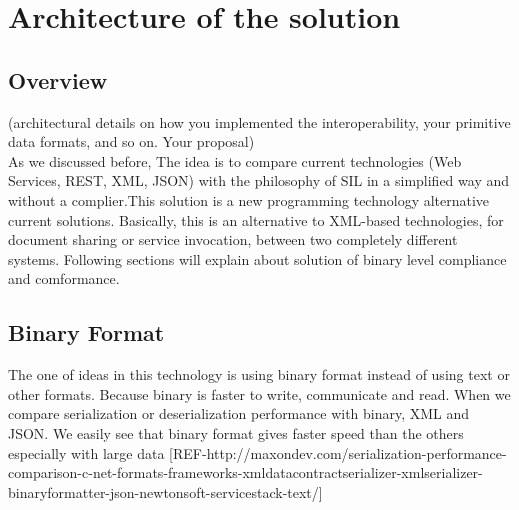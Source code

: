 
\chapter{Architecture of the solution}
\label{chapter:architecture}


\section{Overview}
\label{section:overview}
(architectural details on how you implemented the interoperability, your primitive data formats, and so on. Your proposal)\\

As we discussed before, The idea is to compare current technologies (Web Services, REST, XML, JSON) with the philosophy of
SIL in a simplified way and without a complier.This solution is a new programming technology alternative current solutions.
Basically, this is an alternative to XML-based technologies, for document sharing or service invocation, between two
completely different systems. Following sections will explain about solution of binary level compliance and comformance.

\section{Binary Format}
\label{section:binary}

The one of ideas in this technology is using binary format instead of using text or other formats. Because binary is faster to
write, communicate and read. When we compare serialization or deserialization performance with binary, XML and JSON.
We easily see that binary format gives faster speed than the others especially with large data
[REF-http://maxondev.com/serialization-performance-comparison-c-net-formats-frameworks-xmldatacontractserializer-xmlserializer-binaryformatter-json-newtonsoft-servicestack-text/]
\\

